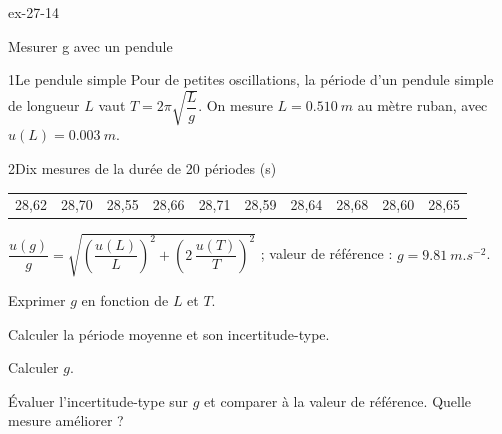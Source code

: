 \begin{blocLivre}{ex-27-14}
\begin{exercice}[3]{Mesurer g avec un pendule}
\begin{docu}{1}{Le pendule simple}
Pour de petites oscillations, la période d'un pendule simple de longueur $L$ vaut $T=2\pi\sqrt{\dfrac{L}{g}}$. On mesure
$L=\qty{0,510}{m}$ au mètre ruban, avec $u(L)=\qty{0,003}{m}$.
\end{docu}
\begin{docu}{2}{Dix mesures de la durée de 20 périodes (s)}
\begin{tabular}{cccccccccc}
28,62 & 28,70 & 28,55 & 28,66 & 28,71 & 28,59 & 28,64 & 28,68 & 28,60 & 28,65 \\
\end{tabular}
\end{docu}
\begin{donnees}
$\dfrac{u(g)}{g}=\sqrt{\left(\dfrac{u(L)}{L}\right)^2+\left(2\,\dfrac{u(T)}{T}\right)^2}$ ; valeur de référence : $g=\qty{9,81}{m.s^{-2}}$.
\end{donnees}
\begin{questions}
\item Exprimer $g$ en fonction de $L$ et $T$.
\item Calculer la période moyenne et son incertitude-type.
\item Calculer $g$.
\item \initiative Évaluer l'incertitude-type sur $g$ et comparer à la valeur de référence. Quelle mesure améliorer ?
\end{questions}
\end{exercice}
\end{blocLivre}
